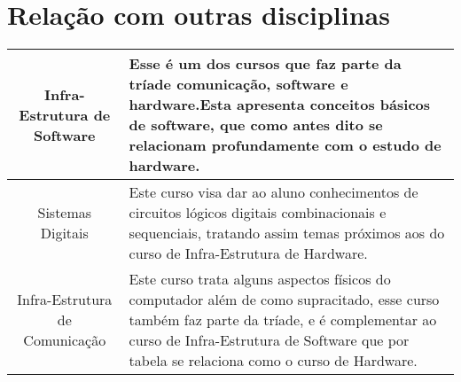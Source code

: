 \documentclass{article}
\begin{document}
\section{Relação com outras disciplinas}
\begin{center}
\begin{tabular}{ |c|m{25em}| } 
 \hline
Infra-Estrutura de Software & Esse é um dos cursos que faz parte da tríade comunicação, software e hardware.Esta apresenta conceitos básicos de software, que como antes dito se relacionam profundamente com o estudo de hardware.\citep{ref3} \\ 
\hline
 Sistemas  Digitais  &  Este curso visa dar ao aluno conhecimentos de circuitos lógicos digitais combinacionais e sequenciais, tratando assim temas próximos aos do curso de Infra-Estrutura de Hardware.\citep{ref3} \\ 
\hline
Infra-Estrutura de Comunicação & Este curso trata alguns aspectos físicos do computador além de como  supracitado, esse curso também faz parte da tríade, e é complementar ao curso de Infra-Estrutura de Software que por tabela se relaciona como o curso de Hardware. \citep{ref4}\\ 
 \hline
\end{tabular}
\end{center}




\end{document}
